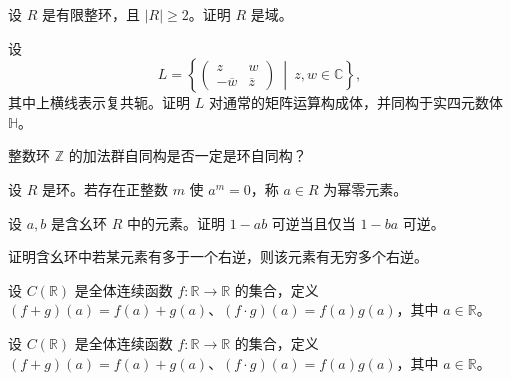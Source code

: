 \noindent\begin{minipage}{\textwidth}
设 $R$ 是有限整环，且 $|R|\ge 2$。证明 $R$ 是域。
\end{minipage}\par\vfill
\newpage
\noindent\begin{minipage}{\textwidth}
设
\[
L=\left\{\begin{pmatrix}z&w\\-\overline{w}&\overline{z}\end{pmatrix}\ \middle|\ z,w\in\mathbb{C}\right\},
\]
其中上横线表示复共轭。证明 $L$ 对通常的矩阵运算构成体，并同构于实四元数体 $\mathbb{H}$。
\end{minipage}\par\vfill
\noindent\begin{minipage}{\textwidth}
整数环 $\mathbb{Z}$ 的加法群自同构是否一定是环自同构？
\end{minipage}\par\vfill
\noindent\begin{minipage}{\textwidth}
设 $R$ 是环。若存在正整数 $m$ 使 $a^m=0$，称 $a\in R$ 为幂零元素。
\end{minipage}\par\vfill
\newpage
\noindent\begin{minipage}{\textwidth}
设 $a,b$ 是含幺环 $R$ 中的元素。证明 $1-ab$ 可逆当且仅当 $1-ba$ 可逆。
\end{minipage}\par\vfill
\noindent\begin{minipage}{\textwidth}
证明含幺环中若某元素有多于一个右逆，则该元素有无穷多个右逆。
\end{minipage}\par\vfill
\noindent\begin{minipage}{\textwidth}
设 $C(\mathbb{R})$ 是全体连续函数 $f\colon\mathbb{R}\to\mathbb{R}$ 的集合，定义 $(f+g)(a)=f(a)+g(a)$、$(f\cdot g)(a)=f(a)g(a)$，其中 $a\in\mathbb{R}$。
\end{minipage}\par\vfill
\newpage
\noindent\begin{minipage}{\textwidth}
设 $C(\mathbb{R})$ 是全体连续函数 $f\colon\mathbb{R}\to\mathbb{R}$ 的集合，定义 $(f+g)(a)=f(a)+g(a)$、$(f\cdot g)(a)=f(a)g(a)$，其中 $a\in\mathbb{R}$。
\end{minipage}\par\vfill
